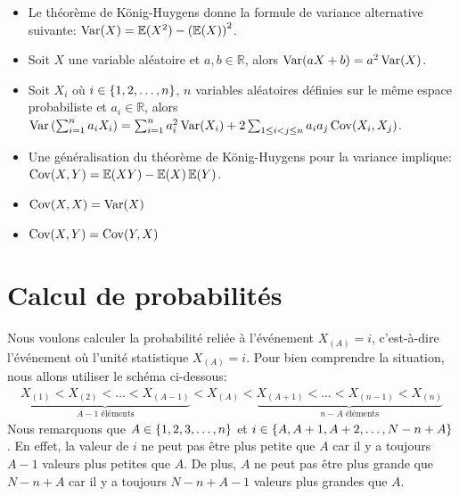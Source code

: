 \documentclass[10pt]{article}
\begin{document}
\begin{itemize}
\item
  Le théorème de König-Huygens donne la formule de variance alternative
  suivante: \(\operatorname{Var}(X)=\operatorname{\mathbb{E}}(X^2)-\left(\operatorname{\mathbb{E}}(X)\right)^2\).
\item
  Soit \(X\) une variable aléatoire et \(a,b\in\mathbb{R}\), alors
  \(\operatorname{Var}(aX+b)=a^2\operatorname{Var}(X)\).
\item
  Soit \(X_i\) où \(i\in\left\{1,2,\ldots,n\right\}\), \(n\) variables aléatoires
  définies sur le même espace probabiliste et \(a_i\in\mathbb{R}\),
  alors
  \(\operatorname{Var}\left(\sum_{i=1}^n a_iX_i\right)=\sum_{i=1}^n a_i^2\operatorname{Var}(X_i)+2\sum_{1\leq i< j\leq n} a_ia_j\operatorname{Cov}(X_i,X_j)\).
\item
  Une généralisation du théorème de König-Huygens pour la variance
  implique: \(\operatorname{Cov}(X,Y)=\operatorname{\mathbb{E}}(XY)-\operatorname{\mathbb{E}}(X)\operatorname{\mathbb{E}}(Y)\).
\item
  \(\operatorname{Cov}(X,X)=\operatorname{Var}(X)\)
\item
  \(\operatorname{Cov}(X,Y)=\operatorname{Cov}(Y,X)\)
\end{itemize}

\hypertarget{calcul-de-probabilites}{%
\section{\texorpdfstring{Calcul de probabilités
\label{calculs_proba}}{Calcul de probabilités }}\label{calcul-de-probabilites}}

Nous voulons calculer la probabilité reliée à l'événement \(X_{(A)}=i\),
c'est-à-dire l'événement où l'unité statistique \(X_{(A)}=i\). Pour bien
comprendre la situation, nous allons utiliser le schéma ci-dessous:
\begin{align*}
\underbrace{X_{(1)} <  X_{(2)} < \ldots < X_{(A-1)}}_{A-1 \text{ éléments}} 
< X_{(A)} 
< \underbrace{X_{(A+1)} < \ldots < X_{(n-1)} < X_{(n)}}_{n-A \text{ éléments}}
\end{align*} Nous remarquons que \(A\in\left\{1,2,3,\ldots, n\right\}\) et
\(i\in\left\{A,A+1,A+2,\ldots,N-n+A\right\}\). En effet, la valeur de \(i\) ne
peut pas être plus petite que \(A\) car il y a toujours \(A-1\) valeurs
plus petites que \(A\). De plus, \(A\) ne peut pas être plus grande que
\(N-n+A\) car il y a toujours \(N-n+A-1\) valeurs plus grandes que
\(A\).
\end{document}
